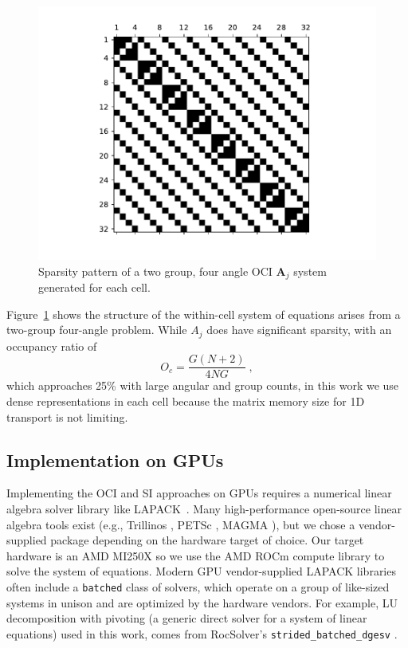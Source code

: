 \begin{figure}
    \centering
    \includegraphics[width=.9\textwidth]{figures/therefore_figs/spy.pdf}
    \caption{Sparsity pattern of a two group, four angle OCI $\bm{A}_j$ system generated for each cell.}
    \label{fig:spyA}
\end{figure}

Figure~\ref{fig:spyA} shows the structure of the within-cell system of equations arises from a two-group four-angle problem.
While $A_j$ does have significant sparsity, with an occupancy ratio of
\begin{equation}
    O_c = \frac{G(N+2)}{4NG} 
    \; ,
\end{equation}
which approaches 25\% with large angular and group counts, in this work we use dense representations in each cell because the matrix memory size for 1D transport is not limiting.

\subsection{Implementation on GPUs}

Implementing the OCI and SI approaches on GPUs requires a numerical linear algebra solver library like LAPACK~\cite{laug}.
Many high-performance open-source linear algebra tools exist (e.g., Trillinos \cite{trilinos-website}, PETSc \cite{petsc-user-ref}, MAGMA \cite{magma}), but we chose a vendor-supplied package depending on the hardware target of choice.
Our target hardware is an AMD MI250X so we use the AMD ROCm compute library to solve the system of equations.
Modern GPU vendor-supplied LAPACK libraries often include a \texttt{batched} class of solvers,
which operate on a group of like-sized systems in unison and are optimized by the hardware vendors.
For example, LU decomposition with pivoting (a generic direct solver for a system of linear equations) used in this work, comes from RocSolver's \texttt{strided\_batched\_dgesv} \cite{rocsolver}.

